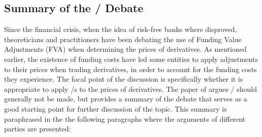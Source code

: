 \documentclass[../../../main.tex]{subfiles}
\begin{document}
    \subsection{Summary of the \FVA/ Debate}
        Since the financial crisis, when the idea of risk-free banks where disproved,
        theoreticians and practitioners have been debating the use of Funding Value Adjustments (FVA)
        when determining the prices of derivatives.
        As mentioned earlier, the existence of funding costs have led some entities 
        to apply adjustments to their prices when trading derivatives, 
        in order to account for the funding costs they experience.
        The focal point of the discussion is specifically 
        whether it is appropriate to apply \FVA/s to the prices of derivatives.
        The paper of \cite{HullWhiteFVA} argues \FVA/ should generally not be made,
        but provides a summary of the debate that serves as a good starting point for further discussion of the topic.
        This summary is paraphrased in the the following paragraphs where the arguments of different parties are presented:
\end{document}
